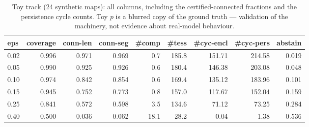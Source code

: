\begin{table}[t]
\centering
\caption{Toy track (24 synthetic maps): all columns, including the certified-connected fractions and the persistence cycle counts. Toy $p$ is a blurred copy of the ground truth --- validation of the machinery, not evidence about real-model behaviour.}
\label{tab:toy}
\small
\begin{tabular}{lrrrrrrrr}
\toprule
\textbf{eps} & \textbf{coverage} & \textbf{conn-len} & \textbf{conn-seg} & \textbf{\#comp} & \textbf{\#tess} & \textbf{\#cyc-encl} & \textbf{\#cyc-pers} & \textbf{abstain} \\
\midrule
0.02 & 0.996 & 0.971 & 0.969 & 0.7 & 185.8 & 151.71 & 214.58 & 0.019 \\
0.05 & 0.990 & 0.925 & 0.926 & 0.6 & 180.4 & 146.38 & 203.08 & 0.048 \\
0.10 & 0.974 & 0.842 & 0.854 & 0.6 & 169.4 & 135.12 & 183.96 & 0.101 \\
0.15 & 0.945 & 0.752 & 0.773 & 0.8 & 157.0 & 117.67 & 152.04 & 0.159 \\
0.25 & 0.841 & 0.572 & 0.598 & 3.5 & 134.6 & 71.12 & 73.25 & 0.284 \\
0.40 & 0.500 & 0.036 & 0.062 & 18.1 & 28.2 & 0.04 & 1.38 & 0.536 \\
\bottomrule
\end{tabular}
\end{table}
